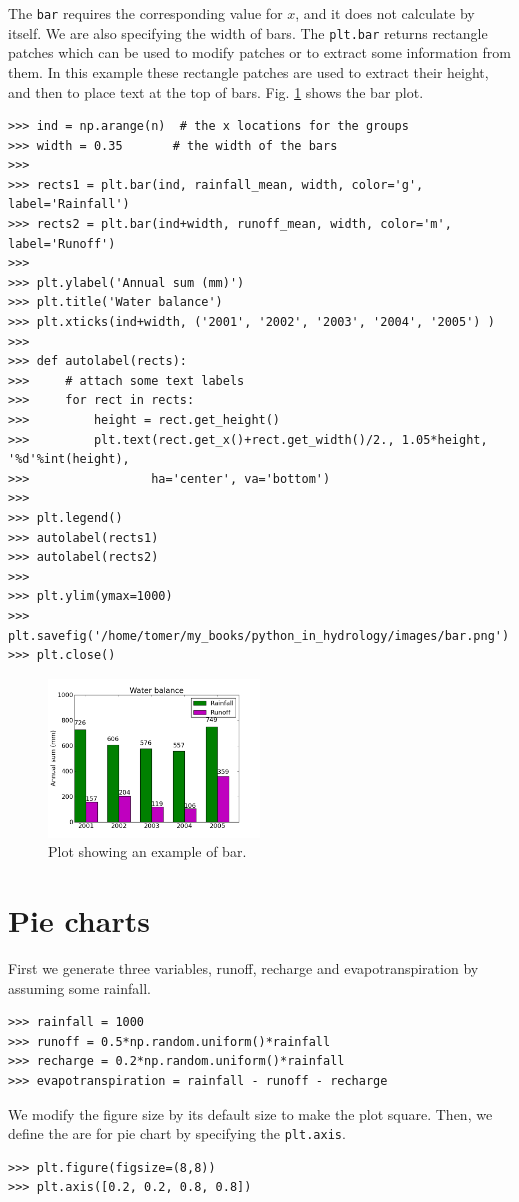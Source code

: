 \documentclass[10pt]{book}
\begin{document}
The \verb"bar" requires the corresponding value for $x$, and it does not calculate by itself. We are also specifying the width of bars. The 
\verb"plt.bar" returns rectangle patches which can be used to modify  patches or to extract some information from them. In this example these rectangle patches are used to extract their height, and then to place text at the top of bars. Fig. \ref{fig:bar} shows the bar plot. 
\beforeverb \begin{verbatim}
>>> ind = np.arange(n)  # the x locations for the groups
>>> width = 0.35       # the width of the bars
>>> 
>>> rects1 = plt.bar(ind, rainfall_mean, width, color='g', label='Rainfall')
>>> rects2 = plt.bar(ind+width, runoff_mean, width, color='m', label='Runoff')
>>> 
>>> plt.ylabel('Annual sum (mm)')
>>> plt.title('Water balance')
>>> plt.xticks(ind+width, ('2001', '2002', '2003', '2004', '2005') )
>>> 
>>> def autolabel(rects):
>>>     # attach some text labels
>>>     for rect in rects:
>>>         height = rect.get_height()
>>>         plt.text(rect.get_x()+rect.get_width()/2., 1.05*height, '%d'%int(height),
>>>                 ha='center', va='bottom')
>>> 
>>> plt.legend()
>>> autolabel(rects1)
>>> autolabel(rects2)
>>> 
>>> plt.ylim(ymax=1000)
>>> plt.savefig('/home/tomer/my_books/python_in_hydrology/images/bar.png')
>>> plt.close()
\end{verbatim} \afterverb

\beforefig
\begin{figure}[h!]
  \centering
    \includegraphics[width=0.5\textwidth]{images/bar.png}
  \caption{Plot showing an example of bar.}
   \label{fig:bar}
\end{figure}
\afterfig

\section{Pie charts}
First we generate three variables, runoff, recharge and evapotranspiration by assuming some rainfall. 
\beforeverb \begin{verbatim}
>>> rainfall = 1000
>>> runoff = 0.5*np.random.uniform()*rainfall
>>> recharge = 0.2*np.random.uniform()*rainfall
>>> evapotranspiration = rainfall - runoff - recharge
\end{verbatim} \afterverb
We modify the figure size by its default size to make the plot square. Then, we define the are for pie chart by specifying the \verb"plt.axis". 
\beforeverb \begin{verbatim}
>>> plt.figure(figsize=(8,8))
>>> plt.axis([0.2, 0.2, 0.8, 0.8])
\end{verbatim} \afterverb
\end{document}
